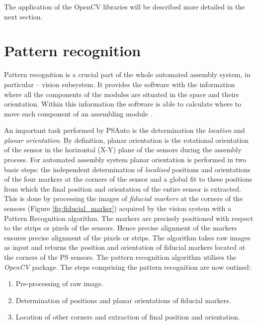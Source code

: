 The application of the OpenCV libraries will be described more detailed in the next section.

\section{Pattern recognition}

Pattern recognition is a crucial part of the whole automated assembly system, in particular -- vision subsystem. It provides the software with the information where all the components of the modules are situated in the space and theirs orientation. Within this information the software is able to calculate where to move each component of an assembling module \cite{AutomatedAssembly_tutorial}.

An important task performed by PSAuto is the determination the \emph{location} and \emph{planar orientation}. By definition, planar orientation is the rotational orientation of the sensor in the horizontal (X-Y) plane of the sensors during the assembly process. For automated assembly system planar orientation is performed in two basic steps: the independent determination of \emph{localised} positions and orientations of the four markers at the corners of the sensor and a global fit to these positions from which the final position and orientation of the entire sensor is extracted. This is done by processing the images of \emph{fiducial markers} at the corners of the sensors (Figure \ref{fig:fiducial_marker}) acquired by the vision system with a Pattern Recognition algorithm. The markers are precisely positioned with respect to the strips or pixels of the sensors. Hence precise alignment of the markers ensures precise alignment of the pixels or strips. The algorithm takes raw images as input and returns the position and orientation of fiducial markers located at the corners of the PS sensors. The pattern recognition algorithm utilises the \emph{OpenCV} package. The steps comprising the pattern recognition are now outined:

\begin{enumerate}
\setlength\itemsep{-0.5em}
\item Pre-processing of raw image.
\item Determination of positions and planar orientations of fiducial markers.
\item Location of other corners and extraction of final position and orientation.
\end{enumerate}

